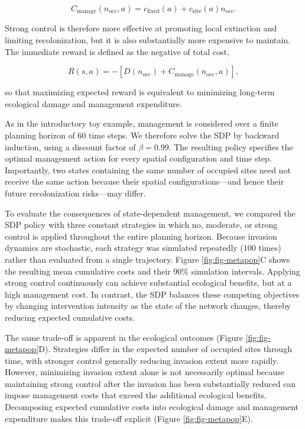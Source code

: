 \documentclass[
  11pt,
  a4paper,
]{article}
\begin{document}
\[
C_{\mathrm{manage}}(n_{\mathrm{occ}},a)
=
c_{\mathrm{fixed}}(a)
+
c_{\mathrm{site}}(a)n_{\mathrm{occ}}.
\]

Strong control is therefore more effective at promoting local extinction and limiting recolonization, but it is also substantially more expensive to maintain. The immediate reward is defined as the negative of total cost,

\[
R(s,a)
=
-
\left[
D(n_{\mathrm{occ}})
+
C_{\mathrm{manage}}(n_{\mathrm{occ}},a)
\right],
\]

so that maximizing expected reward is equivalent to minimizing long-term ecological damage and management expenditure.

As in the introductory toy example, management is considered over a finite planning horizon of 60 time steps. We therefore solve the SDP by backward induction, using a discount factor of \(\beta=0.99\). The resulting policy specifies the optimal management action for every spatial configuration and time step. Importantly, two states containing the same number of occupied sites need not receive the same action because their spatial configurations---and hence their future recolonization risks---may differ.

To evaluate the consequences of state-dependent management, we compared the SDP policy with three constant strategies in which no, moderate, or strong control is applied throughout the entire planning horizon. Because invasion dynamics are stochastic, each strategy was simulated repeatedly (100 times) rather than evaluated from a single trajectory. Figure \ref{fig:fig-metapop}C shows the resulting mean cumulative costs and their 90\% simulation intervals. Applying strong control continuously can achieve substantial ecological benefits, but at a high management cost. In contrast, the SDP balances these competing objectives by changing intervention intensity as the state of the network changes, thereby reducing expected cumulative costs.

The same trade-off is apparent in the ecological outcomes (Figure \ref{fig:fig-metapop}D). Strategies differ in the expected number of occupied sites through time, with stronger control generally reducing invasion extent more rapidly. However, minimizing invasion extent alone is not necessarily optimal because maintaining strong control after the invasion has been substantially reduced can impose management costs that exceed the additional ecological benefits. Decomposing expected cumulative costs into ecological damage and management expenditure makes this trade-off explicit (Figure \ref{fig:fig-metapop}E).
\end{document}
